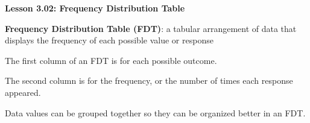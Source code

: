 \begin{center}
\textbf{Lesson 3.02: Frequency Distribution Table}
\end{center}

\vspace*{-1.5ex}

\noindent\textbf{Frequency Distribution Table (FDT)}: a tabular arrangement of data that displays the frequency of each possible value or response

\noindent The first column of an FDT is for each possible outcome.

\noindent The second column is for the frequency, or the number of times each response appeared.

\noindent Data values can be grouped together so they can be organized better in an FDT.

